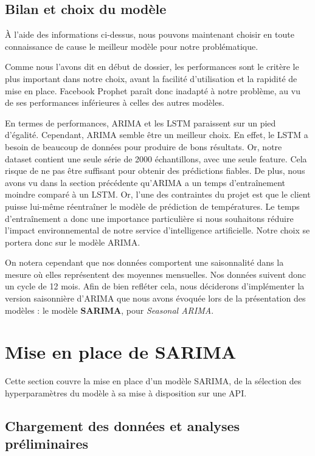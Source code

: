 \documentclass[french]{article}
\begin{document}
    \subsection{Bilan et choix du modèle}
    À l'aide des informations ci-dessus, nous pouvons maintenant choisir en toute connaissance de cause le meilleur modèle pour notre problématique.

    Comme nous l'avons dit en début de dossier, les performances sont le critère le plus important dans notre choix, avant la facilité d'utilisation et la rapidité de mise en place. Facebook Prophet paraît donc inadapté à notre problème, au vu de ses performances inférieures à celles des autres modèles.

    En termes de performances, ARIMA et les LSTM paraissent sur un pied d'égalité. Cependant, ARIMA semble être un meilleur choix. En effet, le LSTM a besoin de beaucoup de données pour produire de bons résultats. Or, notre dataset contient une seule série de 2000 échantillons, avec une seule feature. Cela risque de ne pas être suffisant pour obtenir des prédictions fiables. De plus, nous avons vu dans la section précédente qu'ARIMA a un temps d'entraînement moindre comparé à un LSTM. Or, l'une des contraintes du projet est que le client puisse lui-même réentraîner le modèle de prédiction de températures. Le temps d'entraînement a donc une importance particulière si nous souhaitons réduire l'impact environnemental de notre service d'intelligence artificielle. Notre choix se portera donc sur le modèle ARIMA.

    On notera cependant que nos données comportent une saisonnalité dans la mesure où elles représentent des moyennes mensuelles. Nos données suivent donc un cycle de 12 mois. Afin de bien refléter cela, nous déciderons d'implémenter la version saisonnière d'ARIMA que nous avons évoquée lors de la présentation des modèles : le modèle \textbf{SARIMA}, pour \textit{Seasonal ARIMA}.


    
    \section{Mise en place de SARIMA}

    Cette section couvre la mise en place d'un modèle SARIMA, de la sélection des hyperparamètres du modèle à sa mise à disposition sur une API.

    \subsection{Chargement des données et analyses préliminaires}
\end{document}
